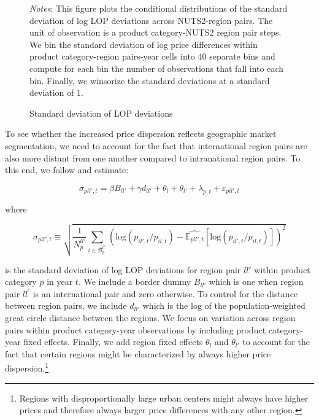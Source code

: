 \begin{figure}[H]
    \centering
    \caption{Standard deviation of LOP deviations}
    \label{fig: redform_lop}
    \scalebox{0.90}{}
     \parbox{\textwidth}{
        \begin{spacing}{1} 
            {\footnotesize 
            \textit{Notes}: This figure plots the conditional distributions of the standard deviation of log LOP deviations across NUTS2-region pairs. The unit of observation is a product category-NUTS2 region pair steps. We bin the standard deviation of log price differences within product category-region pairs-year cells into 40 separate bins and compute for each bin the number of observations that fall into each bin. Finally, we winsorize the standard deviations at a standard deviation of 1.}
        \end{spacing}}
 \end{figure} 

To see whether the increased price dispersion reflects geographic market segmentation, we need to account for the fact that international region pairs are also more distant from one another compared to intranational region pairs. To this end, we follow \citet{Engel1996} and estimate: 
\begin{linenomath*}
    \begin{equation}\label{eq:border_effect_prices}
        \sigma_{pll',t} = \beta B_{ll'} + \gamma d_{ll'} + \theta_l + \theta_{l'} +
                    \lambda_{p,t} + \varepsilon_{pll',t}
    \end{equation}
\end{linenomath*}
\noindent where 

\begin{linenomath*}
    \begin{equation*}
        \sigma_{pll',t} \equiv 
            \sqrt{
                \frac{1}{N^{ll'}_{p}}
                \sum_{i \in \mathcal{B}^{ll'}_{p}} \left(\text{log}\left(p_{il',t}/p_{il,t}\right) - \widehat{\mathbb{E}_{pll',t}}\left[\text{log}\left(p_{il',t}/p_{il,t}\right)\right]
                \right)^2
            }
    \end{equation*}
\end{linenomath*}
is the standard deviation of log LOP deviations for region pair $ll'$ within product category $p$ in year $t$. We include a border dummy $B_{ll'}$ which is one when region pair $ll^{'}$ is an international pair and zero otherwise. To control for the distance between region pairs, we include $d_{ll'}$ which is the log of the population-weighted great circle distance between the regions. We focus on variation across region pairs within product category-year observations by including product category-year fixed effects. Finally, we add region fixed effects $\theta_l$ and $\theta_{l'}$ to account for the fact that certain regions might be characterized by always higher price dispersion.\footnote{Regions with disproportionally large urban centers might always have higher prices and therefore always larger price differences with any other region.}

